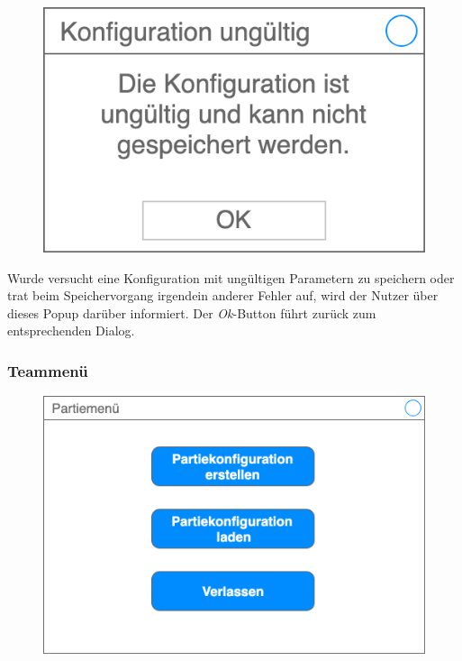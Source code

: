     \begin{figure}[H]
        \centering
        \includegraphics[width=\textwidth/2]{images/konfiguration_ungueltig}
    \end{figure}

    Wurde versucht eine Konfiguration mit ungültigen Parametern zu speichern oder trat beim Speichervorgang irgendein anderer Fehler auf, wird der Nutzer über dieses Popup darüber informiert. Der \textit{Ok}-Button führt zurück zum entsprechenden Dialog.

    \subsubsection{Teammenü}

    \begin{figure}[H]
        \centering
        \includegraphics[width=\textwidth/2]{images/partiemenue}
    \end{figure}

